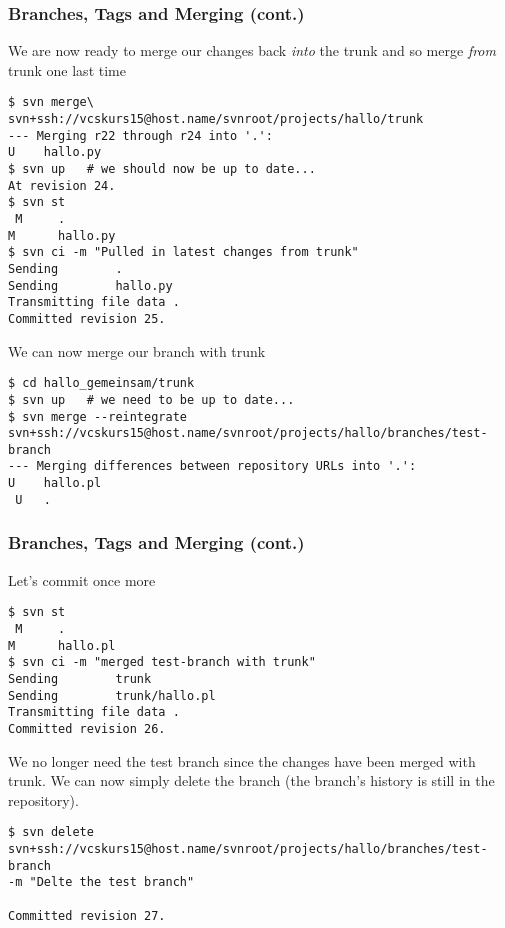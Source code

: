 \begin{frame}[fragile]
    \frametitle{Branches, Tags and Merging (cont.)}
    \linuxframe
    \vspace*{-3mm}

    We are now ready to merge our changes back \emph{into} the trunk and so
    merge \emph{from} trunk one last time

\begin{lstlisting}[basicstyle=\tiny\ttfamily\color{black}]
$ svn merge\
svn+ssh://vcskurs15@host.name/svnroot/projects/hallo/trunk
--- Merging r22 through r24 into '.':
U    hallo.py
$ svn up   # we should now be up to date...
At revision 24.
$ svn st
 M     .
M      hallo.py
$ svn ci -m "Pulled in latest changes from trunk"
Sending        .
Sending        hallo.py
Transmitting file data .
Committed revision 25.
\end{lstlisting}

    We can now merge our branch with trunk
\begin{lstlisting}[basicstyle=\tiny\ttfamily\color{black}]
$ cd hallo_gemeinsam/trunk
$ svn up   # we need to be up to date...
$ svn merge --reintegrate
svn+ssh://vcskurs15@host.name/svnroot/projects/hallo/branches/test-branch
--- Merging differences between repository URLs into '.':
U    hallo.pl
 U   .
\end{lstlisting}

\end{frame}

\begin{frame}[fragile]
    \frametitle{Branches, Tags and Merging (cont.)}
    \linuxframe

    Let's commit once more
\begin{lstlisting}[basicstyle=\tiny\ttfamily\color{black}]
$ svn st
 M     .
M      hallo.pl
$ svn ci -m "merged test-branch with trunk"
Sending        trunk
Sending        trunk/hallo.pl
Transmitting file data .
Committed revision 26.
\end{lstlisting}

We no longer need the test branch since the changes have been merged with
trunk.  We can now simply delete the branch (the branch's history is still in
the repository).
\begin{lstlisting}[basicstyle=\tiny\ttfamily\color{black}]
$ svn delete
svn+ssh://vcskurs15@host.name/svnroot/projects/hallo/branches/test-branch
-m "Delte the test branch"

Committed revision 27.
\end{lstlisting}

\end{frame}


